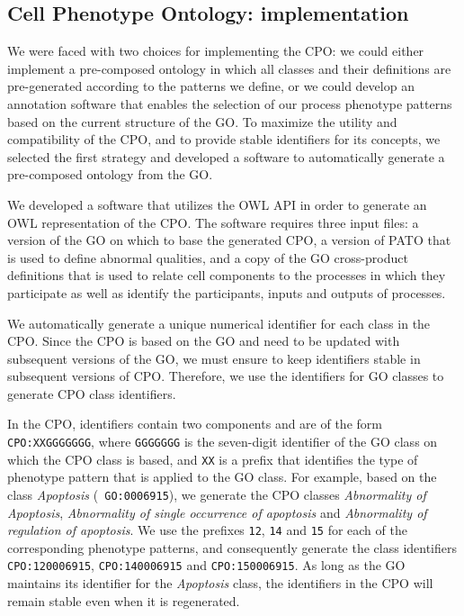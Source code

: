 \documentclass{bioinfo}
\renewcommand{\cite}{\citep}
\begin{document}
\subsection{Cell Phenotype Ontology: implementation}
We were faced with two choices for implementing the CPO: we could
either implement a pre-composed ontology in which all classes and
their definitions are pre-generated according to the patterns we
define, or we could develop an annotation software that enables the
selection of our process phenotype patterns based on the current
structure of the GO.  To maximize the utility and compatibility of the
CPO, and to provide stable identifiers for its concepts, we selected
the first strategy and developed a software to automatically generate
a pre-composed ontology from the GO.

We developed a software that utilizes the OWL API \cite{Horridge2007}
in order to generate an OWL representation of the CPO. The software
requires three input files: a version of the GO on which to base the
generated CPO, a version of PATO that is used to define abnormal
qualities, and a copy of the GO cross-product definitions
\cite{Mungall2010go} that is used to relate cell components to the
processes in which they participate as well as identify the
participants, inputs and outputs of processes.

We automatically generate a unique numerical identifier for each class
in the CPO.  Since the CPO is based on the GO and need to be updated
with subsequent versions of the GO, we must ensure to keep identifiers
stable in subsequent versions of CPO. Therefore, we use the
identifiers for GO classes to generate CPO class identifiers.

In the CPO, identifiers contain two components and are of the form
{\tt CPO:XXGGGGGGG}, where {\tt GGGGGGG} is the seven-digit identifier
of the GO class on which the CPO class is based, and {\tt XX} is a
prefix that identifies the type of phenotype pattern that is applied
to the GO class. For example, based on the class {\em Apoptosis} ({\tt
  GO:0006915}), we generate the CPO classes {\em Abnormality of
  Apoptosis}, {\em Abnormality of single occurrence of apoptosis} and
{\em Abnormality of regulation of apoptosis}.  We use the prefixes
{\tt 12}, {\tt 14} and {\tt 15} for each of the corresponding
phenotype patterns, and consequently generate the class identifiers
{\tt CPO:120006915}, {\tt CPO:140006915} and {\tt CPO:150006915}. As
long as the GO maintains its identifier for the {\em Apoptosis} class,
the identifiers in the CPO will remain stable even when it is
regenerated.
\end{document}
